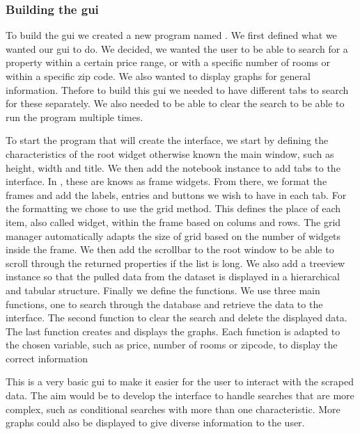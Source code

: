 \documentclass[main]{subfiles}
\begin{document}
\subsubsection{Building the \ac{gui}}
To build the \ac{gui} we created a new program named \pkg[main5.py].
We first defined what we wanted our \ac{gui} to do. 
We decided, we wanted the user to be able to search for a property within a certain price range, 
or with a specific number of rooms or within a specific zip code. We also wanted to display graphs for general information.
Thefore to build this \ac{gui} we needed to have different tabs to search for these separately.
We also needed to be able to clear the search to be able to run the program multiple times. \par
To start the program that will create the interface, we start by defining the characteristics of the root widget otherwise known the main window,
such as height, width and title. We then add the notebook instance to add tabs to the interface.
In \pkg[tkinter], these are knows as frame widgets. From there, we format the frames and add the labels, entries and buttons we wish to have in each tab. 
For the formatting we chose to use the grid method. This defines the place of each item, also called widget, within the frame based on colums and rows.
The grid manager automatically adapts the size of grid based on the number of widgets inside the frame. 
We then add the scrollbar to the root window to be able to scroll through the returned properties if the list is long. 
We also add a treeview instance so that the pulled data from the dataset is displayed in a hierarchical and tabular structure. 
Finally we define the functions. We use three main functions, one to search through the database and retrieve the data to the interface. 
The second function to clear the search and delete the displayed data. The last function creates and displays the graphs. 
Each function is adapted to the chosen variable, such as price, number of rooms or zipcode, to display the correct information \par
This is a very basic \ac{gui} to make it easier for the user to interact with the scraped data.
The aim would be to develop the interface to handle searches that are more complex, such as conditional searches with more than one characteristic.
More graphs could also be displayed to give diverse information to the user. 
\end{document}
